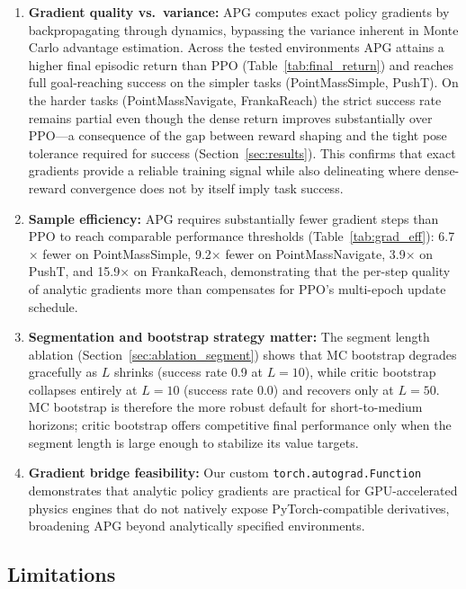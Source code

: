 \documentclass[11pt,a4paper]{article}
\begin{document}
\begin{enumerate}
  \item \textbf{Gradient quality vs.\ variance:} APG computes exact policy gradients by backpropagating through dynamics, bypassing the variance inherent in Monte Carlo advantage estimation. Across the tested environments APG attains a higher final episodic return than PPO (Table~\ref{tab:final_return}) and reaches full goal-reaching success on the simpler tasks (PointMassSimple, PushT). On the harder tasks (PointMassNavigate, FrankaReach) the strict success rate remains partial even though the dense return improves substantially over PPO---a consequence of the gap between reward shaping and the tight pose tolerance required for success (Section~\ref{sec:results}). This confirms that exact gradients provide a reliable training signal while also delineating where dense-reward convergence does not by itself imply task success.

  \item \textbf{Sample efficiency:} APG requires substantially fewer gradient steps than PPO to reach comparable performance thresholds (Table~\ref{tab:grad_eff}): 6.7$\times$ fewer on PointMassSimple, 9.2$\times$ fewer on PointMassNavigate, 3.9$\times$ on PushT, and 15.9$\times$ on FrankaReach, demonstrating that the per-step quality of analytic gradients more than compensates for PPO's multi-epoch update schedule.

  \item \textbf{Segmentation and bootstrap strategy matter:} The segment length ablation (Section~\ref{sec:ablation_segment}) shows that MC bootstrap degrades gracefully as $L$ shrinks (success rate 0.9 at $L=10$), while critic bootstrap collapses entirely at $L=10$ (success rate 0.0) and recovers only at $L=50$. MC bootstrap is therefore the more robust default for short-to-medium horizons; critic bootstrap offers competitive final performance only when the segment length is large enough to stabilize its value targets.

  \item \textbf{Gradient bridge feasibility:} Our custom \texttt{torch.autograd.Function} demonstrates that analytic policy gradients are practical for GPU-accelerated physics engines that do not natively expose PyTorch-compatible derivatives, broadening APG beyond analytically specified environments.
\end{enumerate}

\subsection{Limitations}
\label{sec:limitations}
\end{document}
